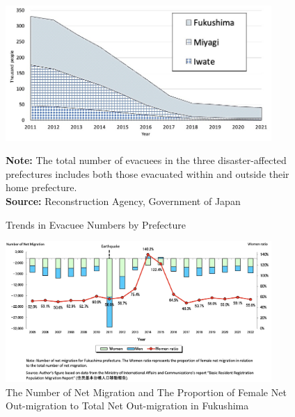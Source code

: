 \documentclass[a4paper,12pt]{article}
\begin{document}
\begin{figure}[h!]
  \centering
  \includegraphics[width=0.9\textwidth]{number_of_evacuees.jpg}
  \footnotesize
  \begin{minipage}{0.9\textwidth}
      \textbf{Note:} The total number of evacuees in the three disaster-affected prefectures includes both those evacuated within and outside their home prefecture.\\
      \textbf{Source:} Reconstruction Agency, Government of Japan
  \end{minipage}
  \caption{Trends in Evacuee Numbers by Prefecture}
  \label{fig:number_of_evacuees}
\end{figure}


\begin{figure}[h!]
    \centering
    \includegraphics[width=0.9\textwidth]{Number of net migration}  %
    \caption{The Number of Net Migration and The Proportion of Female Net Out-migration to Total Net Out-migration in Fukushima}
    \label{fig:number_of_net_migration}
\end{figure}


\end{document}
